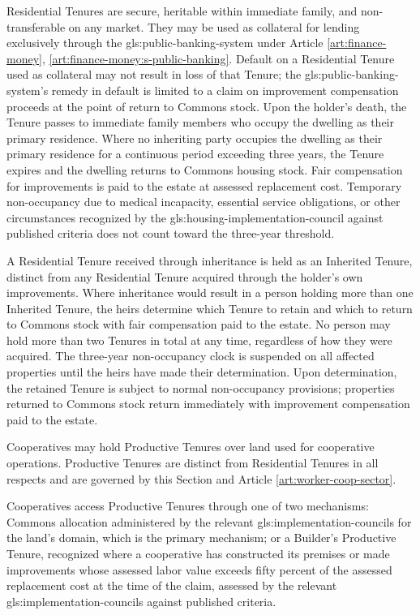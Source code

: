 Residential Tenures are secure, heritable within immediate family, and non-transferable on any market. They may be used as collateral for lending exclusively through the \gls{gls:public-banking-system} under Article \ref{art:finance-money}, \ref{art:finance-money:s-public-banking}. Default on a Residential Tenure used as collateral may not result in loss of that Tenure; the \gls{gls:public-banking-system}'s remedy in default is limited to a claim on improvement compensation proceeds at the point of return to Commons stock. Upon the holder's death, the Tenure passes to immediate family members who occupy the dwelling as their primary residence. Where no inheriting party occupies the dwelling as their primary residence for a continuous period exceeding three years, the Tenure expires and the dwelling returns to Commons housing stock. Fair compensation for improvements is paid to the estate at assessed replacement cost. Temporary non-occupancy due to medical incapacity, essential service obligations, or other circumstances recognized by the \gls{gls:housing-implementation-council} against published criteria does not count toward the three-year threshold.

A Residential Tenure received through inheritance is held as an Inherited Tenure, distinct from any Residential Tenure acquired through the holder's own improvements. Where inheritance would result in a person holding more than one Inherited Tenure, the heirs determine which Tenure to retain and which to return to Commons stock with fair compensation paid to the estate. No person may hold more than two Tenures in total at any time, regardless of how they were acquired. The three-year non-occupancy clock is suspended on all affected properties until the heirs have made their determination. Upon determination, the retained Tenure is subject to normal non-occupancy provisions; properties returned to Commons stock return immediately with improvement compensation paid to the estate.

Cooperatives may hold Productive Tenures over land used for cooperative operations. Productive Tenures are distinct from Residential Tenures in all respects and are governed by this Section and Article \ref{art:worker-coop-sector}.

Cooperatives access Productive Tenures through one of two mechanisms: Commons allocation administered by the relevant \gls{gls:implementation-councils} for the land's domain, which is the primary mechanism; or a Builder's Productive Tenure, recognized where a cooperative has constructed its premises or made improvements whose assessed labor value exceeds fifty percent of the assessed replacement cost at the time of the claim, assessed by the relevant \gls{gls:implementation-councils} against published criteria.

